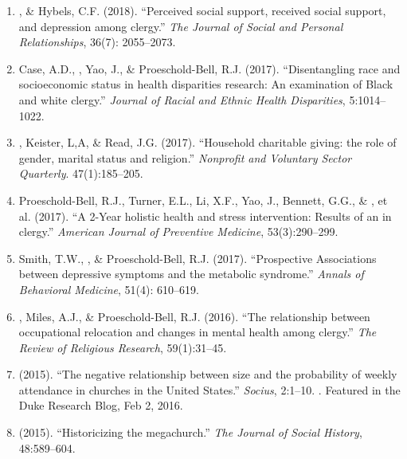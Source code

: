 \begin{enumerate}
\item \Eagle, \& Hybels, C.F. (2018). ``Perceived social support, received social support, and depression among clergy.'' \emph{The Journal of Social and Personal Relationships}, 36(7): 2055--2073. 

\item Case, A.D., \Eagle, Yao, J., \& Proeschold-Bell, R.J. (2017). ``Disentangling race and socioeconomic status in health disparities research: An examination of Black and white clergy.'' \emph{Journal of Racial and Ethnic Health Disparities}, 5:1014--1022. 

\item \Eagle, Keister, L,A, \& Read, J.G. (2017). ``Household charitable giving: the role of gender, marital status and religion.'' \emph{Nonprofit and Voluntary Sector Quarterly}. 47(1):185--205. 

\item Proeschold-Bell, R.J., Turner, E.L., Li, X.F., Yao, J., Bennett, G.G., \& \Eagle, et al. (2017). ``A 2-Year holistic health and stress intervention: Results of an  in clergy.'' \emph{American Journal of Preventive Medicine}, 53(3):290--299. 

\item Smith, T.W., \Eagle\CF, \& Proeschold-Bell, R.J. (2017). ``Prospective Associations between depressive symptoms and the metabolic syndrome.'' \emph{Annals of Behavioral Medicine}, 51(4): 610--619. 

\item \Eagle, Miles, A.J., \& Proeschold-Bell, R.J. (2016). ``The relationship between occupational relocation and changes in mental health among clergy.'' \emph{The Review of Religious Research}, 59(1):31--45. 

\item \Eagle \hspace{.01em} (2015). ``The negative relationship between size and the probability of weekly attendance in churches in the United States.'' \emph{Socius}, 2:1--10.  . Featured in the Duke Research Blog, Feb 2, 2016.

\item \Eagle \hspace{.01em} (2015). ``Historicizing the megachurch.'' \textit{The Journal of Social History}, 48:589--604. 


\end{enumerate}
